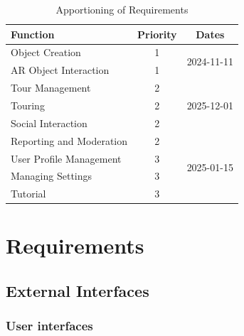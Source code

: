 \documentclass{article}
\begin{document}
\begin{table}[]
    \caption{Apportioning of Requirements}
    \label{tab:apportioning_table}
    \centering
    \begin{tabular}{lcc}
        \toprule
        \textbf{Function}        & \textbf{Priority} & \textbf{Dates}              \\
        \hline \hline
        Object Creation          & 1                 & \multirow{2}{*}{2024-11-11} \\
        AR Object Interaction    & 1                 &                             \\ \hline
        Tour Management          & 2                 & \multirow{3}{*}{2025-12-01} \\
        Touring                  & 2                 &                             \\
        Social Interaction       & 2                 &                             \\
        Reporting and Moderation & 2                 & \multirow{4}{*}{2025-01-15} \\ \hline
        User Profile Management  & 3                 &                             \\
        Managing Settings        & 3                 &                             \\
        Tutorial                 & 3                 &                             \\
        \hline
    \end{tabular}
\end{table}

\section{Requirements}


\subsection{External Interfaces}

\subsubsection{User interfaces}
\end{document}
